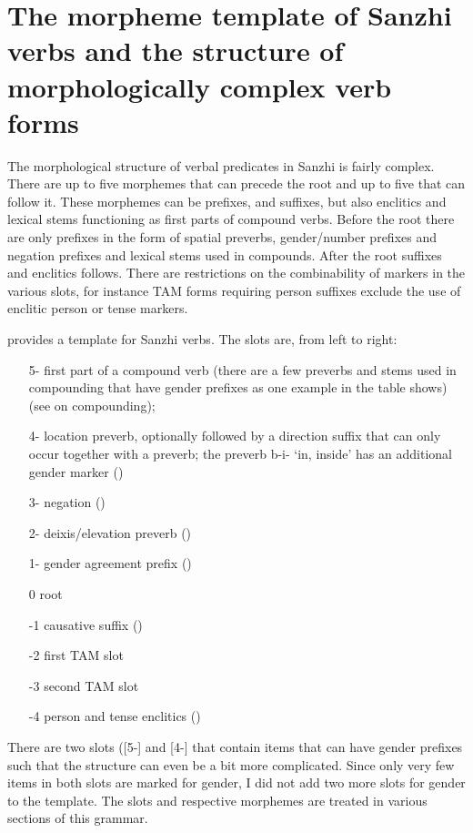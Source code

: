 
\section{The morpheme template of Sanzhi verbs and the structure of morphologically complex verb forms}
\label{sec:The morpheme template of Sanzhi verbs and the structure of morphologically complex verb forms}

The morphological structure of verbal predicates in Sanzhi is fairly complex. There are up to five morphemes that can precede the root and up to five that can follow it. These morphemes can be prefixes, and suffixes, but also enclitics and lexical stems functioning as first parts of compound verbs. Before the root there are only prefixes in the form of spatial preverbs, gender/number prefixes and negation prefixes and lexical stems used in compounds. After the root suffixes and enclitics follows. There are restrictions on the combinability of markers in the various slots, for instance TAM forms requiring person suffixes exclude the use of enclitic person or tense markers.

 provides a template for Sanzhi verbs. The slots are, from left to right:
%
\begin{enumerate}
	\item[5-]	first part of a compound verb (there are a few preverbs and stems used in compounding that have gender prefixes as one example in the table shows) (see  on compounding); 
	\item[4-]	location preverb, optionally followed by a direction suffix that can only occur together with a preverb; the preverb b-i- `in, inside' has an additional gender marker ()
	\item[3-]	negation ()
	\item[2-]	deixis/elevation preverb ()
	\item[1-]	gender agreement prefix ()
	\item[0]	root
	\item[-1]	causative suffix ()
	\item[-2]	first TAM slot 
	\item[-3]	second TAM slot 
	\item[-4]	person and tense enclitics ()
\end{enumerate}
%
There are two slots ([5-] and [4-] that contain items that can have gender prefixes such that the structure can even be a bit more complicated. Since only very few items in both slots are marked for gender, I did not add two more slots for gender to the template. The slots and respective morphemes are treated in various sections of this grammar.
%

